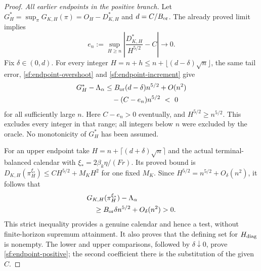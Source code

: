 \documentclass[journal]{IEEEtran}
\begin{document}
\begin{proof}
\par\smallskip\noindent\emph{All earlier endpoints in the positive branch.}
Let $G_H^*=\sup_\pi G_{K,H}(\pi)=O_H-D_{K,H}^*$ and
$d=C/B_{\rm or}$. The already proved limit implies
\begin{equation}\label{sf:endpoint-tail}
e_n:=\sup_{H\ge n}
\left|\frac{D_{K,H}^*}{H^{5/2}}-C\right|\longrightarrow0.
\end{equation}
Fix $\delta\in(0,d)$. For every integer
$H=n+h\le n+\lfloor(d-\delta)\sqrt n\rfloor$, the same tail error,
\eqref{sf:endpoint-overshoot} and \eqref{sf:endpoint-increment} give
\begin{equation}\label{sf:endpoint-lower}
\begin{aligned}
G_H^*-\Lambda_\alpha
 &\le B_{\rm or}(d-\delta)n^{5/2}+O(n^2)\\
 &\quad -(C-e_n)n^{5/2}\ <\ 0
\end{aligned}
\end{equation}
for all sufficiently large $n$. Here $C-e_n>0$ eventually, and
$H^{5/2}\ge n^{5/2}$. This excludes every integer in that range;
all integers below $n$ were excluded by the oracle. No monotonicity of
$G_H^*$ has been assumed.

For an upper endpoint take
$H=n+\lceil(d+\delta)\sqrt n\rceil$ and the actual terminal-balanced
calendar with $\xi_*=2\beta_k\eta/(Fr)$. Its proved bound is
$D_{K,H}(\pi_H^{\xi_*})\le CH^{5/2}+M_KH^2$ for one fixed $M_K$.
Since $H^{5/2}=n^{5/2}+O_\delta(n^2)$, it follows that
\begin{equation}\label{sf:endpoint-upper}
\begin{aligned}
&G_{K,H}(\pi_H^{\xi_*})-\Lambda_\alpha\\
&\quad\ge B_{\rm or}\delta n^{5/2}+O_\delta(n^2)>0.
\end{aligned}
\end{equation}
This strict inequality provides a genuine calendar and hence a test,
without finite-horizon supremum attainment. It also proves that the defining
set for $H_{\rm diag}$ is nonempty. The lower and upper comparisons, followed
by $\delta\downarrow0$, prove \eqref{sf:endpoint-positive}; the second
coefficient there is the substitution of the given $C$.


\end{proof}
\end{document}
